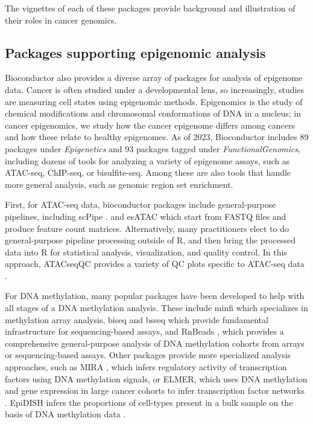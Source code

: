 The vignettes of each of these packages provide background and
illustration of their roles in cancer genomics.

\subsection{Packages supporting epigenomic analysis}\label{packages-supporting-epigenomic-analysis}

Bioconductor also provides a diverse array of packages for analysis of epigenome
data. Cancer is often studied under a developmental lens, so increasingly, studies
are measuring cell states using epigenomic methods. Epigenomics is the study of
chemical modifications and chromosomal conformations of DNA in a nucleus; in cancer
epigenomics, we study how the cancer epigenome differs among cancers and how
these relate to healthy epigenomes. As of 2023, Bioconductor includes 89 packages
under \emph{Epigenetics} and 93 packages tagged under \emph{FunctionalGenomics}, including dozens of tools
for analyzing a variety of epigenome assays, such as ATAC-seq, ChIP-seq, or
bisulfite-seq. Among these are also tools that handle more general analysis, such
as genomic region set enrichment.

First, for ATAC-seq data, bioconductor packages include general-purpose pipelines, including scPipe
\cite{Tian2018}. %
and esATAC \cite{Wei2018} %
which start from FASTQ files and produce feature count
matrices. Alternatively, many practitioners elect to do general-purpose pipeline processing outside of
R, and then bring the processed data into R for statistical analysis,
visualization, and quality control. In this approach, ATACseqQC
provides
a variety of QC plots specific to ATAC-seq data \cite{Ou2018}.%

For DNA methylation, many popular packages have been developed to help with
all stages of a DNA methylation analysis. These include minfi 
\cite{Aryee2014}
which specializes in methylation array analysis, biseq and bsseq \cite{Hansen2012}  %
which provide fundamental infrastructure for sequencing-based assays, and RnBeads
\cite{Mueller2019},
which provides a comprehensive general-purpose analysis of DNA
methylation cohorts from arrays or sequencing-based assays. Other packages provide more specialized
analysis approaches, such as MIRA \cite{Lawson2018}, %
which infers regulatory
activity of transcription factors using DNA methylation signals, %
or ELMER, which uses DNA methylation and gene expression in large cancer
cohorts to infer transcription factor networks \cite{Silva2019}. %
EpiDISH infers
the proportions of cell-types present in a bulk sample on the basis
of DNA methylation data \cite{Zheng2018a}. %

